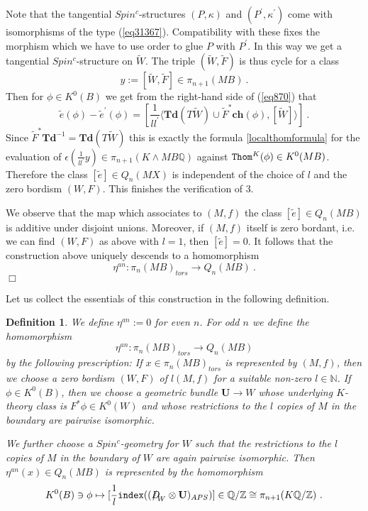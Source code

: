 \documentclass[12pt]{article}
\newtheorem{ddd}[theorem]{Definition}
\newcommand{\Thom}{{\tt Thom}}
\def\hB{\hspace*{\fill}$\Box$ \newline\noindent}
\newcommand{\nat}{{\mathbb{N}}}
\newcommand{\Z}{{\mathbb{Z}}}
\newcommand{\Q}{{\mathbb{Q}}}
\newcommand{\Td}{{\mathbf{Td}}}
\newcommand{\ch}{{\mathbf{ch}}}
\newcommand{\bU}{{\mathbf{U}}}
\newcommand{\Dirac}{{D\hspace{-0.27cm}/}}
\newcommand{\ind}{{\tt index}}
\begin{document}
Note that the tangential  $Spin^{c}$-structures
$(P,\kappa)$ and $(P^{\prime},\kappa^{\prime})$ come with isomorphisms
of the type (\ref{eq31367}). Compatibility with these fixes the morphism which we have to use order to glue $P$ with $P^{\prime}$. In this way we get a tangential  $Spin^{c}$-structure on $\tilde W$.
The triple $(\tilde W,\tilde F)$  is thus  cycle for a class $$y:=[\tilde W,\tilde F]\in \pi_{n+1}(MB)\ .$$
Then for $\phi\in K^{0}(B)$ we get from the right-hand side of (\ref{eq870}) that
$$\tilde e(\phi)-\tilde e^{\prime}(\phi)=[\frac{1}{ll^{\prime}} \langle \Td(T\tilde W)\cup \tilde F^{*}\ch(\phi),[\tilde W]\rangle]\ .$$
Since $\tilde F^{*}\Td^{-1}=\Td(T\tilde W)$ this is exactly the formula \eqref{localthomformula} for the evaluation of  $\epsilon(\frac{1}{ll^{\prime}}y)\in \pi_{n+1}(K\wedge MB\Q)$ against
$\Thom^{K}(\phi)\in K^{0}(MB )$. Therefore the class $[\tilde e]\in Q_{n}(MX)$ is independent of the choice of $l$ and the zero bordism $(W,F)$. This finishes the verification of 3.

We observe that the map
which associates to $(M,f)$ the class 
$[\tilde e]\in Q_{n}(MB)$ is additive under disjoint unions. Moreover, if
$(M,f)$ itself is zero bordant, i.e. we can find $(W,F)$ as above with $l=1$, then
$[\tilde e]=0$. It follows that the construction above uniquely descends to a homomorphism
\begin{equation}\label{etaandef111}\eta^{an}:\pi_{n}(MB)_{tors}\to Q_{n}(MB)\ .\end{equation}
\hB



Let us collect the essentials of this construction in the following definition.
\begin{ddd}\label{etaandef}
We define $\eta^{an}:=0$ for even $n$.
For odd $n$ we define the homomorphism 
$$\eta^{an}:\pi_{n}(MB)_{tors}\to Q_{n}(MB)$$ by the following prescription:
If $x\in \pi_{n}(MB)_{tors}$ is represented by $(M,f)$, then we choose a zero bordism
$(W,F)$ of $l(M,f)$ for a suitable non-zero $l\in \nat$. 
If $\phi\in K^{0}(B )$, then  we choose a geometric bundle $\bU\to W$ whose underlying $K$-theory class is $F^{*}\phi \in K^{0}(W)$ and whose restrictions to
 the $l$ copies of $M$ in the boundary are pairwise isomorphic.
 
We further choose a $Spin^{c}$-geometry for $W$ such that the restrictions to the $l$ copies of $M$ in the boundary of $W$ are again pairwise isomorphic. Then $\eta^{an}(x)\in Q_{n}(MB)$ is represented by the homomorphism
\begin{equation}\label{eq133}K^{0}(B )\ni \phi\mapsto [\frac{1}{l} \ind((\Dirac_{W}\otimes \bU)_{APS})]\in \Q/\Z\cong \pi_{n+1}(K\Q/\Z)\ .\end{equation}
\end{ddd}
\end{document}
